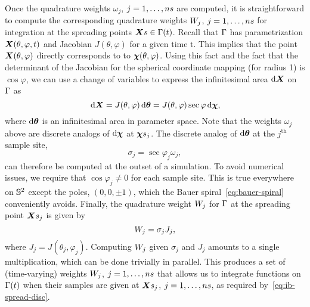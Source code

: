 Once the quadrature weights $\omega_j$, $j=1, \ldots, \sample\cardinality$ are computed, it is straightforward to
compute the corresponding quadrature weights $\weight[j]$, $j=1, \ldots, \sample\cardinality$ for integration at
the spreading points $\sample\X \in \interface(t)$. Recall that $\Gamma$ has parametrization
$\boldsymbol{X}(\theta, \varphi, t)$ and Jacobian $J(\theta, \varphi)$ for a given time t. This implies that the point
$\boldsymbol{X}(\theta, \varphi)$ directly corresponds to to $\boldsymbol{\chi}(\theta, \varphi)$. Using this fact and the fact that the
determinant of the Jacobian for the spherical coordinate mapping (for radius 1) is $\cos\varphi$, we can use a
change of variables to express the infinitesimal area $\d\X$ on $\Gamma$ as
\begin{equation}\label{eq:quad-cov}
    \d\X
    = J(\theta, \varphi)\d\qs
    = J(\theta, \varphi)\sec\varphi\d\Xp,
\end{equation}
where $\d\qs$ is an infinitesimal area in parameter space. Note that the weights $\omega_j$ above are discrete
analogs of $\d\Xp$ at $\Xpsj$. The discrete analog of $\d\qs$ at the $j^\text{th}$ sample site,
\begin{equation*}
    \sigma_j=\sec\varphi_j\omega_j,
\end{equation*}
can therefore be computed at the outset of a simulation. To avoid numerical issues, we require that
$\cos\varphi_j \neq 0$ for each sample site. This is true everywhere on $\mathbb{S}^2$ except the poles,
$(0, 0, \pm1)$, which the Bauer spiral~\eqref{eq:bauer-spiral} conveniently avoids. Finally, the quadrature weight
$\weight[j]$ for $\Gamma$ at the spreading point $\Xsj$ is given by
\begin{equation}
    \weight[j] = \sigma_j J_j,
\end{equation}
where $J_j = J(\theta_j, \varphi_j)$. Computing $\weight[j]$ given $\sigma_j$ and $J_j$ amounts to a single
multiplication, which can be done trivially in parallel. This produces a set of (time-varying) weights
$\weight[j]$, $j=1, \ldots, \sample\cardinality$ that allows us to integrate functions on $\Gamma(t)$ when
their samples are given at $\Xsj$, $j=1, \ldots, \sample\cardinality$, as required by~\eqref{eq:ib-spread-disc}.
